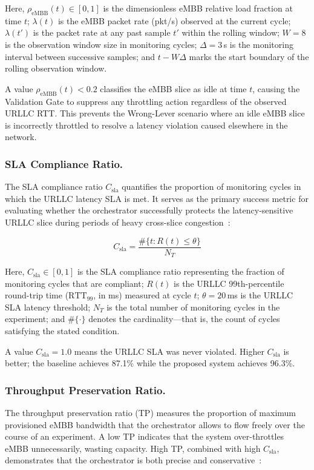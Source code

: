 \documentclass[12pt]{article}
\begin{document}
\noindent Here, $\rho_\text{eMBB}(t) \in [0,1]$ is the dimensionless
eMBB relative load fraction at time $t$; $\lambda(t)$ is the eMBB packet
rate (pkt/s) observed at the current cycle; $\lambda(t')$ is the packet
rate at any past sample $t'$ within the rolling window; $W = 8$ is the
observation window size in monitoring cycles; $\Delta = 3$\,s is the
monitoring interval between successive samples; and $t - W\Delta$ marks
the start boundary of the rolling observation window.

\noindent A value $\rho_\text{eMBB}(t) < 0.2$ classifies the eMBB slice
as idle at time $t$, causing the Validation Gate to suppress any
throttling action regardless of the observed URLLC RTT. This prevents
the Wrong-Lever scenario where an idle eMBB slice is incorrectly throttled
to resolve a latency violation caused elsewhere in the network.

\subsubsection{SLA Compliance Ratio.}
The SLA compliance ratio $C_\text{sla}$ quantifies the proportion of
monitoring cycles in which the URLLC latency SLA is met. It serves as
the primary success metric for evaluating whether the orchestrator
successfully protects the latency-sensitive URLLC slice during periods
of heavy cross-slice congestion~\cite{tsai2021upf}:

\begin{equation}
  C_\text{sla}
    = \frac{\#\bigl\{t : R(t) \leq \theta\bigr\}}{N_T}
  \label{eq:csla}
\end{equation}

\noindent Here, $C_\text{sla} \in [0,1]$ is the SLA compliance ratio
representing the fraction of monitoring cycles that are compliant;
$R(t)$ is the URLLC 99th-percentile round-trip time
($\text{RTT}_{99}$, in ms) measured at cycle $t$; $\theta = 20$\,ms
is the URLLC SLA latency threshold; $N_T$ is the total number of
monitoring cycles in the experiment; and $\#\{\cdot\}$ denotes the
cardinality---that is, the count of cycles satisfying the stated
condition.

\noindent A value $C_\text{sla} = 1.0$ means the URLLC SLA was never
violated. Higher $C_\text{sla}$ is better; the baseline achieves
87.1\% while the proposed system achieves 96.3\%.

\subsubsection{Throughput Preservation Ratio.}
The throughput preservation ratio (TP) measures the proportion of maximum
provisioned eMBB bandwidth that the orchestrator allows to flow freely
over the course of an experiment. A low TP indicates that the system
over-throttles eMBB unnecessarily, wasting capacity. High TP, combined
with high $C_\text{sla}$, demonstrates that the orchestrator is both
precise and conservative~\cite{sulaiman2024microopt}:
\end{document}

